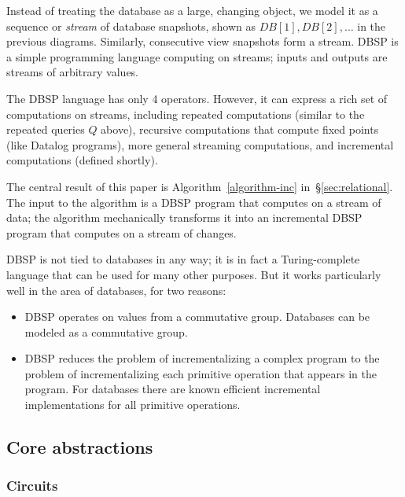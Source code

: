 \documentclass[twocolumn
]{svjour3}
\numberwithin{equation}{section}
\newcommand{\dbsp}{DBSP\xspace}
\newcommand{\secref}[1]{\S\ref{#1}}  %
\newcommand{\refsec}[1]{\secref{#1}}
\begin{document}
Instead of treating the database as a large, changing object, we model
it as a sequence or \emph{stream} of database snapshots, shown as
$DB[1], DB[2], \ldots$ in the previous diagrams.  Similarly,
consecutive view snapshots form a stream.  \dbsp is a simple
programming language computing on streams; inputs and outputs are
streams of arbitrary values.

The \dbsp language has only 4 operators.  However, it can express a
rich set of computations on streams, including repeated computations
(similar to the repeated queries $Q$ above), recursive computations
that compute fixed points (like Datalog programs), more general
streaming computations, and incremental computations (defined
shortly).

The central result of this paper is Algorithm~\ref{algorithm-inc}
in~\refsec{sec:relational}.  The input to the algorithm is a \dbsp
program that computes on a stream of data; the algorithm mechanically
transforms it into an incremental \dbsp program that computes on a
stream of changes.

\dbsp is not tied to databases in any way; it is in fact a
Turing-complete language that can be used for many other purposes.
But it works particularly well in the area of databases, for two
reasons:

\begin{itemize}[nosep, leftmargin=0pt, itemindent=0.5cm]
  \item \dbsp operates on values from a commutative group.  Databases
    can be modeled as a commutative group.
  \item \dbsp reduces the problem of incrementalizing a complex
    program to the problem of incrementalizing each primitive
    operation that appears in the program.  For databases there are
    known efficient incremental implementations for all primitive
    operations.
\end{itemize}

\subsection{Core abstractions}

\subsubsection{Circuits}
\end{document}
